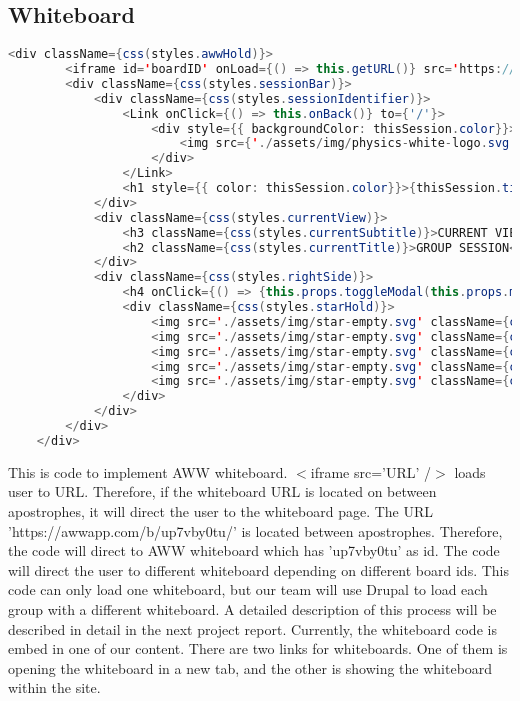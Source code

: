 \documentclass[10pt, letterpaper]{article}
\begin{document}
    \subsection{Whiteboard}
    
    \begin{lstlisting}[language=Java, caption=Implementing Whiteboard]
    <div className={css(styles.awwHold)}>
        <iframe id='boardID' onLoad={() => this.getURL()} src='https://awwapp.com/b/up7vby0tu'/>
        <div className={css(styles.sessionBar)}>
            <div className={css(styles.sessionIdentifier)}>
                <Link onClick={() => this.onBack()} to={'/'}>
                    <div style={{ backgroundColor: thisSession.color}}>
                        <img src={'./assets/img/physics-white-logo.svg'}/>
                    </div>
                </Link>
                <h1 style={{ color: thisSession.color}}>{thisSession.title}</h1>
            </div>
            <div className={css(styles.currentView)}>
                <h3 className={css(styles.currentSubtitle)}>CURRENT VIEW</h3>
                <h2 className={css(styles.currentTitle)}>GROUP SESSION</h2>
            </div>
            <div className={css(styles.rightSide)}>
                <h4 onClick={() => {this.props.toggleModal(this.props.modal)}}>Rate this experience: </h4>
                <div className={css(styles.starHold)}>
                    <img src='./assets/img/star-empty.svg' className={css(styles.star)} />
                    <img src='./assets/img/star-empty.svg' className={css(styles.star)} />
                    <img src='./assets/img/star-empty.svg' className={css(styles.star)} />
                    <img src='./assets/img/star-empty.svg' className={css(styles.star)} />
                    <img src='./assets/img/star-empty.svg' className={css(styles.star)} />
                </div>
            </div>
        </div>
    </div>
    \end{lstlisting}
        This is code to implement AWW whiteboard. $<$iframe src='URL' /$>$ loads user to URL. Therefore, if the whiteboard URL is located on between apostrophes, it will direct the user to the whiteboard page. The URL\\ 'https://awwapp.com/b/up7vby0tu/' is located between apostrophes. Therefore, the code will direct to AWW whiteboard which has 'up7vby0tu' as id. The code will direct the user to different whiteboard depending on different board ids. This code can only load one whiteboard, but our team will use Drupal to load each group with a different whiteboard. A detailed description of this process will be described in detail in the next project report. Currently, the whiteboard code is embed in one of our content. There are two links for whiteboards. One of them is opening the whiteboard in a new tab, and the other is showing the whiteboard within the site. 
        \cleardoublepage
\end{document}
